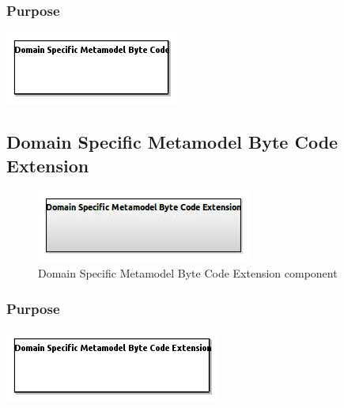 \documentclass{gemoc} %
\begin{document}
\subsubsection{Purpose}

\begin{center}
\includegraphics*[trim=0.0cm 0.0cm 0cm 0.0cm, clip=true]{../images/generated/Generated_Domain_Specific_Metamodel_Byte_Code.png}
\end{center}



\subsection{Domain Specific Metamodel Byte Code Extension}

\begin{figure}[htp]
	\begin{center}
	\includegraphics*[trim=0.0cm 0.0cm 0cm 0.0cm, clip=true, scale=1.0]{../images/generated/Generated_Domain Specific Metamodel Byte Code Extension.jpg}
	\caption{Domain Specific Metamodel Byte Code Extension component}
	\end{center}
\end{figure}

\subsubsection{Purpose}

\begin{center}
\includegraphics*[trim=0.0cm 0.0cm 0cm 0.0cm, clip=true]{../images/generated/Generated_Domain_Specific_Metamodel_Byte_Code_Extension.png}
\end{center}
\end{document}

